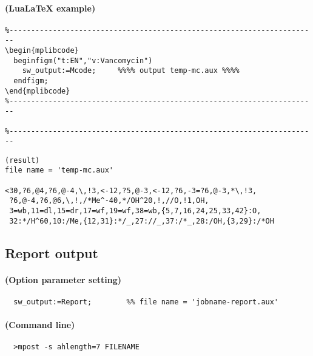 \documentclass[a4paper]{article}
\begin{document}
\paragraph{(LuaLaTeX example)}
\begin{verbatim}
%-----------------------------------------------------------------------
\begin{mplibcode}
  beginfigm("t:EN","v:Vancomycin")
    sw_output:=Mcode;     %%%% output temp-mc.aux %%%%
  endfigm;
\end{mplibcode}
%-----------------------------------------------------------------------

%-----------------------------------------------------------------------
\end{verbatim}
\begin{verbatim}
(result)
file name = 'temp-mc.aux'

<30,?6,@4,?6,@-4,\,!3,<-12,?5,@-3,<-12,?6,-3=?6,@-3,*\,!3,
 ?6,@-4,?6,@6,\,!,/*Me^-40,*/OH^20,!,//O,!1,OH,
 3=wb,11=dl,15=dr,17=wf,19=wf,38=wb,{5,7,16,24,25,33,42}:O,
 32:*/H^60,10:/Me,{12,31}:*/_,27://_,37:/*_,28:/OH,{3,29}:/*OH
\end{verbatim}
\newpage
\noindent%
\subsection{Report output}
\paragraph{(Option parameter setting)}
%
%
\begin{verbatim}
  sw_output:=Report;        %% file name = 'jobname-report.aux'
\end{verbatim}
\paragraph{(Command line)}
\begin{verbatim}
  >mpost -s ahlength=7 FILENAME
\end{verbatim}
\end{document}
